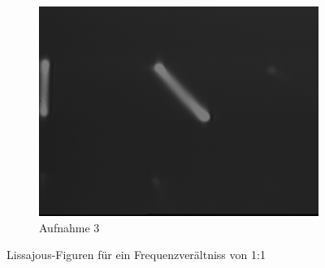 \documentclass[bigchapter,colorback,accentcolor=tud4b,linedtoc,11pt]{tudreport}
\begin{document}
\begin{figure}[H]
\begin{subfigure}[h]{0.32\textwidth}
    \includegraphics[width=\textwidth]{data/Aufgabe7/1-1-180.png}
    \caption[Cap for listoffigures]{Aufnahme 3}
  \end{subfigure}%
  \caption{Lissajous-Figuren für ein Frequenzverältniss von 1:1}
\end{figure}
\end{document}
